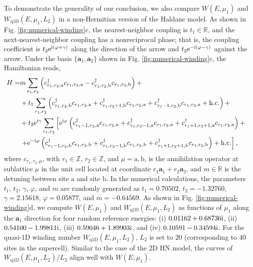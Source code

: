 \documentclass[pdflatex,sn-nature, iicol]{sn-jnl}%
\theoremstyle{thmstyleone}%
\theoremstyle{thmstyletwo}%
\theoremstyle{thmstylethree}%
\begin{document}
To demonstrate the generality of our conclusion, we also compare $W(E,\mu_{1})$
and $W_{\text{q1D}}(E,\mu_{1},L_{2})$ in a non-Hermitian version
of the Haldane model. As shown in Fig. \ref{fig:numerical-winding}c,
the nearest-neighbor coupling is $t_{1}\in\mathbb{R}$, and the next-nearest-neighbor
coupling has a nonreciprocal phase; that is, the coupling coefficient
is $t_{2}\mathrm{e}^{\mathrm{i}\left(\varphi+\gamma\right)}$ along the direction
of the arrow and $t_{2}\mathrm{e}^{-\mathrm{i}\left(\varphi-\gamma\right)}$ against
the arrow. Under the basis $\{\mathbf{a}_{1},\mathbf{a}_{2}\}$ shown
in Fig. \ref{fig:numerical-winding}c, the Hamiltonian reads, 
\begin{align}
H= & m\sum_{r_{1},r_{2}}\left(c_{r_{1},r_{2},\mathrm{a}}^{\dagger}c_{r_{1},r_{2},\mathrm{a}}-c_{r_{1},r_{2},\mathrm{b}}^{\dagger}c_{r_{1},r_{2},\mathrm{b}}\right)+\nonumber \\
 & +t_{1}\sum_{r_{1},r_{2}}\left(c_{r_{1},r_{2},\mathrm{b}}^{\dagger}c_{r_{1},r_{2},\mathrm{a}}+c_{r_{1},r_{2}+1,\mathrm{b}}^{\dagger}c_{r_{1},r_{2},\mathrm{a}}+c_{r_{1}-1,r_{2},\mathrm{b}}^{\dagger}c_{r_{1},r_{2},\mathrm{a}}+\text{h.c.}\right)+\nonumber \\
 & +t_{2}\mathrm{e}^{\mathrm{i}\gamma}\sum_{r_{1},r_{2}}\left[\mathrm{e}^{\mathrm{i}\varphi}\left(c_{r_{1}-1,r_{2},\mathrm{a}}^{\dagger}c_{r_{1},r_{2},\mathrm{a}}+c_{r_{1},r_{2}-1,\mathrm{a}}^{\dagger}c_{r_{1},r_{2},\mathrm{a}}+c_{r_{1}+1,r_{2}+1,\mathrm{a}}^{\dagger}c_{r_{1},r_{2},\mathrm{a}}\right)+\right.\nonumber \\
 & \left.+\mathrm{e}^{-\mathrm{i}\varphi}\left(c_{r_{1}-1,r_{2},\mathrm{b}}^{\dagger}c_{r_{1},r_{2},\mathrm{b}}+c_{r_{1},r_{2}-1,\mathrm{b}}^{\dagger}c_{r_{1},r_{2},\mathrm{b}}+c_{r_{1}+1,r_{2}+1,\mathrm{b}}^{\dagger}c_{r_{1},r_{2},\mathrm{b}}\right)+\text{h.c.}\right],
\end{align}
where $c_{r_{1},r_{2},\mu}$, with $r_{1}\in\mathbb{Z}$, $r_{2}\in\mathbb{Z}$,
and $\mu=\mathrm{a},\mathrm{b}$, is the annihilation operator at
sublattice $\mu$ in the unit cell located at coordinate $r_{1}\mathbf{a}_{1}+r_{2}\mathbf{a}_{2}$,
and $m\in\mathbb{R}$ is the detuning between site $\mathrm{a}$ and
site $\mathrm{b}$. In the numerical calculations, the parameters
$t_{1}$, $t_{2}$, $\gamma$, $\varphi$, and $m$ are randomly generated
as $t_{1}=0.70502$, $t_{2}=-1.32760$, $\gamma=2.15618$, $\varphi=0.05877$,
and $m=-0.64569$. As shown in Fig. \ref{fig:numerical-winding}d,
we compute $W(E,\mu_{1})$ and $W_{\text{q1D}}(E,\mu_{1},L_{2})$
as functions of $\mu_{1}$ along the $\mathbf{a}_{1}$ direction for
four random reference energies: (i) $0.01162+0.68736\mathrm{i}$, (ii) $0.54100-1.99811\mathrm{i}$,
(iii) $0.59046+1.89903\mathrm{i}$, and (iv) $0.10591-0.34594\mathrm{i}$. For
the quasi-1D winding number $W_{\text{q1D}}(E,\mu_{1},L_{2})$, $L_{2}$
is set to $20$ (corresponding to $40$ sites in the supercell). Similar
to the case of the 2D HN model, the curves of $W_{\text{q1D}}(E,\mu_{1},L_{2})/L_{2}$
align well with $W(E,\mu_{1})$.
\end{document}
